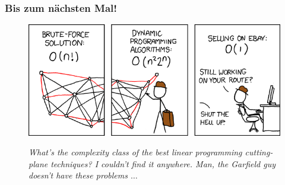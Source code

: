 \begin{frame}
	\frametitle{Bis zum nächsten Mal!}
	
	\begin{figure}[H]
		\includegraphics[width= \textwidth]{images/399_traveling_salesman}
		
		\textit{\scriptsize{What's the complexity class of the best linear programming cutting-plane techniques? I couldn't find it anywhere. Man, the Garfield guy doesn't have these problems $\ldots$}}
	\end{figure}
\end{frame}


